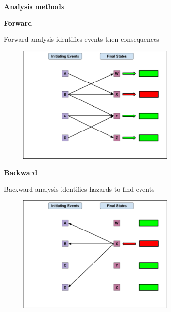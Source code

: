 \documentclass[aspectratio=1610,pdftex,dvipsnames,compress,xcolor={dvipsnames}]{beamer}
\begin{document}
\begin{frame}[plain]{}
    \centering\LARGE\textbf{Analysis methods}
\end{frame}


\begin{frame}[plain]{}
    \centering\LARGE\textbf{Forward}
\end{frame}


\addtocounter{framenumber}{-2}
\begin{frame}{Forward analysis identifies events then consequences}
    \begin{figure}
        \centering
        \includegraphics[width=0.70\textwidth]{forward.jpg}
    \end{figure}
\end{frame}


\begin{frame}[plain]{}
    \centering\LARGE\textbf{Backward}
\end{frame}


\addtocounter{framenumber}{-1}
\begin{frame}{Backward analysis identifies hazards to find events}
    \begin{figure}
        \centering
        \includegraphics[width=0.70\textwidth]{backward.jpg}
    \end{figure}
\end{frame}
\end{document}
